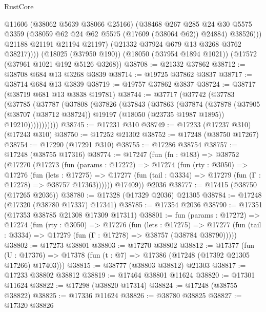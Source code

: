 \begin{lexlean}{RustCore}
\begin{coremodule}
                @11606
                (@38062 @5639 @38066 @25166)
                (@38468
                  @267
                  @285
                  @24
                  @30
                  @5575
                  @3359
                  (@38059 @62 @24 @62 @5575 (@17609 (@38064 @62)) @24884)
                  @38526)))
            @21188
            @21191
            @21194
            @21197)
          (@21332 @37924 @679 @13 @3268 @3762 @38217))))
    (@18025 (@37950 @190))
    (@18050 (@37954 @1894 @1021))
    (@17572 (@37961 @1021 @192 @5126 @3268))
@38708 := @21332 @37862
@38712 := @38708 @684 @13 @3268 @3839
@38714 := @19725 @37862 @3837
@38717 := @38714 @684 @13 @3839
@38719 := @19757 @37862 @3837
@38724 := @38717 (@38719 @681 @13 @3838 @19781)
@38744 := @37717
    (@37742
      (@37783
        (@37785
          (@37787
            (@37808
              (@37826
                (@37843
                  (@37863
                    (@37874
                      (@37878
                        (@37905
                          (@38707 (@38712 @38724))
                          @19197
                          (@18050 (@23735 @1987 @1895))
                          @19210)))))))))))
@38745 := @17231 @310
@38749 := @17233 (@17237 @310) (@17243 @310)
@38750 := @17252 @21302
@38752 := @17248 (@38750 @17267)
@38754 := @17290 (@17291 @310)
@38755 := @17286 @38754
@38757 := @17248 (@38755 @17316)
@38774 := @17247
    (fun (fn : @183) =>
    @38752
      (@17270
        (@17273
          (fun (params : @17272) =>
          @17274
            (fun (rty : @3050) =>
            @17276
              (fun (lets : @17275) =>
              @17277 (fun (tail : @3334) => @17279 (fun (Γ : @17278) => @38757 @17363))))))
        @17409))
    @2036
@38777 := @17415 (@38750 (@17265 @2036))
@38780 := @17328 (@17329 @2036) @21305
@38784 := @17248 (@17320 (@38780 @17337) @17341)
@38785 := @17354 @2036
@38790 := @17351 (@17353 @38785 @21308 @17309 @17311)
@38801 := fun (params : @17272) =>
  @17274
    (fun (rty : @3050) =>
    @17276
      (fun (lets : @17275) =>
      @17277 (fun (tail : @3334) => @17279 (fun (Γ : @17278) => @38757 (@38784 @38790)))))
@38802 := @17273 @38801
@38803 := @17270 @38802
@38812 := @17377
    (fun (U : @17376) => @17378 (fun (t : @7) => @17386 (@17248 (@17392 @21305 @17266) @17403)))
@38815 := @38777 (@38803 @38812) @21303
@38817 := @17233 @38802 @38812
@38819 := @17464 @38801 @11624
@38820 := @17301 @11624
@38822 := @17298 (@38820 @17314)
@38824 := @17248 (@38755 @38822)
@38825 := @17336 @11624
@38826 := @38780 @38825
@38827 := @17320 @38826

\end{coremodule}
\end{lexlean}
